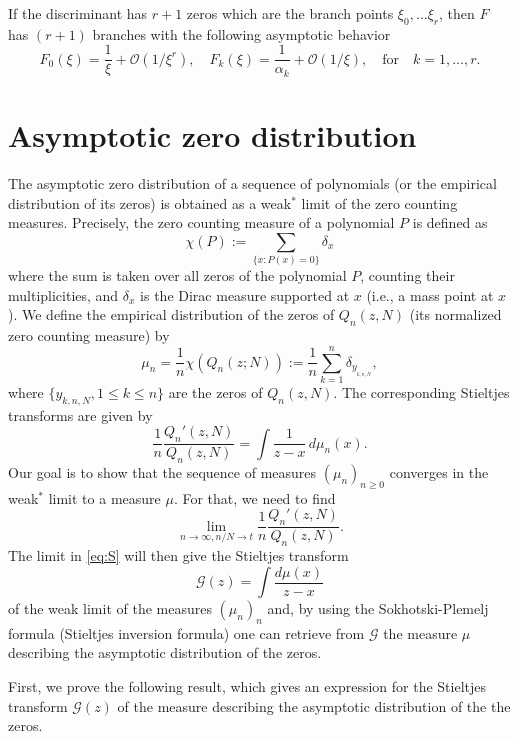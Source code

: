 \documentclass[12pt]{article}
\newcommand{\Gt}{\mathcal{G}} %
\numberwithin{equation}{section}
\begin{document}
If the discriminant has $r+1$ zeros which are the branch points $\xi_0,\ldots \xi_r$, then $F$ has $(r+1)$ branches with the following asymptotic behavior 
\[
	F_0 (\xi) = \frac{1}{\xi} + \mathcal{O} (1/\xi^r) , 
	\quad F_k(\xi) = \frac{1}{\alpha_k}  + \mathcal{O}\left(1/\xi\right), 
	\quad \text{for} \quad k=1,\ldots ,r .
\]







\section{Asymptotic zero distribution}\label{sec:Asympt}

The asymptotic zero distribution of a sequence of polynomials (or the empirical distribution of its zeros) is obtained as a weak$^*$ limit of the zero counting measures. Precisely, the zero counting measure of a polynomial $P$ is defined as 
\[
	\chi (P) := \sum_{\{x:P(x)=0\}} \delta_x
\]
where the sum is taken over all zeros of the polynomial $P$, counting their multiplicities, and $\delta_x$ is the Dirac measure supported at $x$ (i.e., a mass point at $x$). We define the  empirical distribution of the zeros of $Q_n(z,N)$  (its normalized zero counting measure) by
\[
	\mu_{n} = \frac{1}{n} \chi(Q_n(z;N)):= \frac{1}{n} \sum_{k=1}^n  \delta_{y_{{}_{k,n,N}}} , 
\]
where $\{y_{k,n,N}, 1 \leq k \leq n \}$ are the zeros of $Q_n(z,N)$. The corresponding Stieltjes transforms are given by 
\[    \frac{1}{n} \frac{Q_n'(z,N)}{Q_n(z,N)} = \int \frac{1}{z-x} \, d\mu_n(x). 
\]
Our goal is to show that the sequence of measures $(\mu_n)_{n\geq0}$ converges in the weak$^*$ limit to a measure $\mu$.  
For that, we need to find 
\begin{equation}   \label{eq:S}
   \lim_{n \to \infty, n/N \to t} \frac{1}{n} \frac{Q_n'(z,N)}{Q_n(z,N)}. 
\end{equation}
The limit in \eqref{eq:S} will then give the Stieltjes transform
\[  \Gt(z) = \int \frac{d\mu(x)}{z-x}  \] 
of the weak limit of the measures $(\mu_n)_n$ and, by using the Sokhotski-Plemelj formula (Stieltjes inversion formula) one can retrieve from $\Gt$ the measure $\mu$ describing 
the asymptotic distribution of the zeros.  


First, we prove the following result, which gives an expression for the Stieltjes transform \(\Gt(z)\) of the measure describing the asymptotic distribution of the the zeros. 
\end{document}
